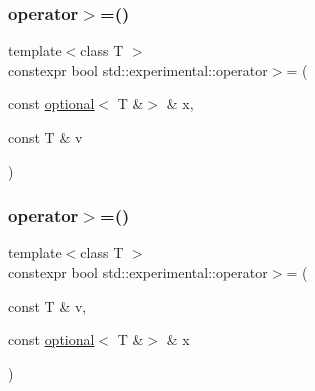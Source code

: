 \mbox{\label{namespacestd_1_1experimental_a8e331f49161fae9a2dc83a0838d5c332}} 
\subsubsection{\texorpdfstring{operator$>$=()}{operator>=()}\hspace{0.1cm}{\footnotesize\ttfamily [6/9]}}
{\footnotesize\ttfamily template$<$class T $>$ \\
constexpr bool std\+::experimental\+::operator$>$= (\begin{DoxyParamCaption}\item[{const \mbox{\hyperlink{classstd_1_1experimental_1_1optional}{optional}}$<$ T \&$>$ \&}]{x,  }\item[{const T \&}]{v }\end{DoxyParamCaption})}

\mbox{\label{namespacestd_1_1experimental_af08a779caea9116149f04d2b2e330b44}} 
\subsubsection{\texorpdfstring{operator$>$=()}{operator>=()}\hspace{0.1cm}{\footnotesize\ttfamily [7/9]}}
{\footnotesize\ttfamily template$<$class T $>$ \\
constexpr bool std\+::experimental\+::operator$>$= (\begin{DoxyParamCaption}\item[{const T \&}]{v,  }\item[{const \mbox{\hyperlink{classstd_1_1experimental_1_1optional}{optional}}$<$ T \&$>$ \&}]{x }\end{DoxyParamCaption})}

\mbox{\label{namespacestd_1_1experimental_a43c159cf8ffd0e172adbac601809aacd}} 
